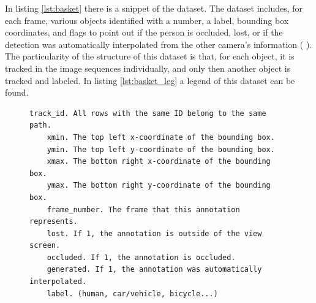 In listing \ref{lst:basket} there is a snippet of the dataset. The dataset includes, for each frame, various objects identified with a number, a label, bounding box coordinates, and flags to point out if the person is occluded, lost, or if the detection was automatically interpolated from the other camera's information ( \cite{EPFLEcolepolytechniquefederaledeLausanne}). The particularity of the structure of this dataset is that, for each object, it is tracked in the image sequences individually, and only then another object is tracked and labeled. In listing \ref{lst:basket_leg} a legend of this dataset can be found.

\begin{figure}[htp]

\begin{center}
	\begin{lstlisting}[label={lst:basket_leg}, caption={EPFL dataset legend.}]
	track_id. All rows with the same ID belong to the same path.
	xmin. The top left x-coordinate of the bounding box.
	ymin. The top left y-coordinate of the bounding box.
	xmax. The bottom right x-coordinate of the bounding box.
	ymax. The bottom right y-coordinate of the bounding box.
	frame_number. The frame that this annotation represents.
	lost. If 1, the annotation is outside of the view screen.
	occluded. If 1, the annotation is occluded.
	generated. If 1, the annotation was automatically interpolated.
	label. (human, car/vehicle, bicycle...)	\end{lstlisting}
\end{center}

\end{figure}
 



